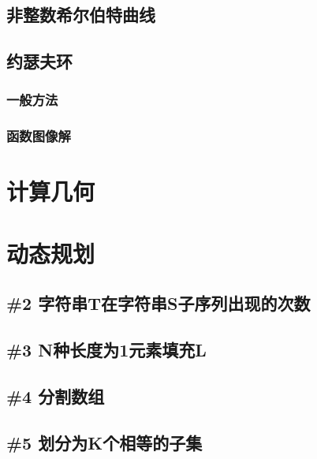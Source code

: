 \documentclass[landscape,twoside,a4paper]{article}
\begin{document}
\subsection{非整数希尔伯特曲线}


\subsection{约瑟夫环}
\subsubsection{一般方法}

\subsubsection{函数图像解}


\section{计算几何}


\section{动态规划}

\subsection{\#2 字符串T在字符串S子序列出现的次数}


\subsection{\#3 N种长度为1元素填充L}


\subsection{\#4 分割数组}


\subsection{\#5 划分为K个相等的子集}

\end{document}
